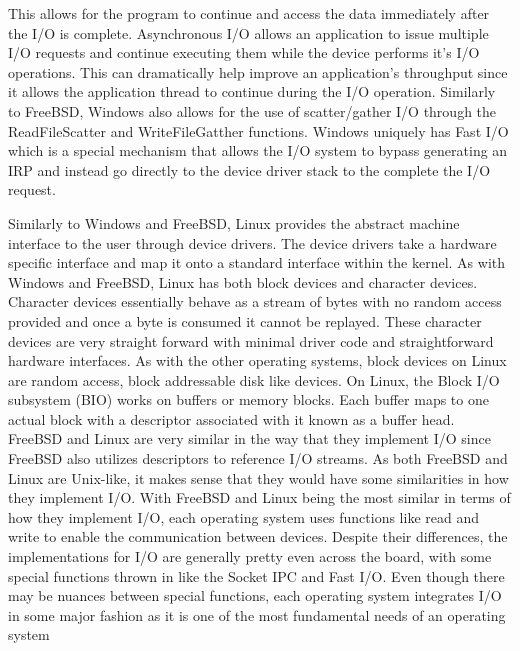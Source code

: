\documentclass[letterpaper,10pt,draftclsnofoot,onecolumn,titlepage]{IEEEtran}
\begin{document}
	This allows for the program to continue and access the data immediately after the I/O is complete.
	Asynchronous I/O allows an application to issue multiple I/O requests and continue executing them while the device performs it's I/O operations.
	This can dramatically help improve an application's throughput since it allows the application thread to continue during the I/O operation.
	Similarly to FreeBSD, Windows also allows for the use of scatter/gather I/O through the ReadFileScatter and WriteFileGatther functions.
	Windows uniquely has Fast I/O which is a special mechanism that allows the I/O system to bypass generating an IRP and instead go directly to the device driver stack to the complete the I/O request.

	Similarly to Windows and FreeBSD, Linux provides the abstract machine interface to the user through device drivers.
	The device drivers take a hardware specific interface and map it onto a standard interface within the kernel.
	As with Windows and FreeBSD, Linux has both block devices and character devices.
	Character devices essentially behave as a stream of bytes with no random access provided and once a byte is consumed it cannot be replayed. \cite{Linux}
	These character devices are very straight forward with minimal driver code and straightforward hardware interfaces.
	As with the other operating systems, block devices on Linux are random access, block addressable disk like devices.
	On Linux, the Block I/O subsystem (BIO) works on buffers or memory blocks.
	Each buffer maps to one actual block with a descriptor associated with it known as a buffer head.
	FreeBSD and Linux are very similar in the way that they implement I/O since FreeBSD also utilizes descriptors to reference I/O streams.
	As both FreeBSD and Linux are Unix-like, it makes sense that they would have some similarities in how they implement I/O.
	With FreeBSD and Linux being the most similar in terms of how they implement I/O, each operating system uses functions like read and write to enable the communication between devices.
	Despite their differences, the implementations for I/O are generally pretty even across the board, with some special functions thrown in like the Socket IPC and Fast I/O.
	Even though there may be nuances between special functions, each operating system integrates I/O in some major fashion as it is one of the most fundamental needs of an operating system
\end{document}
